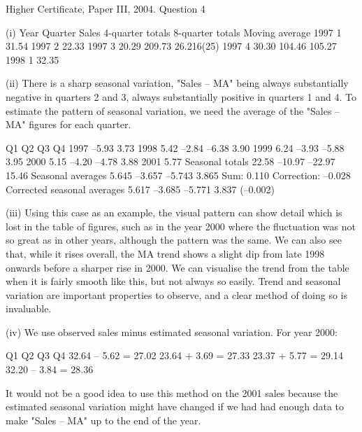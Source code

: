 \documentclass[a4paper,12pt]{article}
\begin{document}
Higher Certificate, Paper III, 2004.  Question 4 
 
 
(i) 
Year Quarter Sales 4-quarter totals 8-quarter totals 
Moving average 
1997 1 31.54    1997 2 22.33   1997 3 20.29 209.73 26.216(25) 1997 4 30.30 
 104.46 105.27   1998 1 32.35    
 
 
(ii) There is a sharp seasonal variation, "Sales – MA" being always substantially negative in quarters 2 and 3, always substantially positive in quarters 1 and 4.  To estimate the pattern of seasonal variation, we need the average of the "Sales – MA" figures for each quarter. 
 
 Q1 Q2 Q3 Q4   1997     –5.93   3.73   1998   5.42   –2.84   –6.38   3.90   1999   6.24   –3.93   –5.88   3.95   2000   5.15   –4.20   –4.78   3.88   2001   5.77      Seasonal totals 22.58 –10.97 –22.97 15.46   Seasonal averages     5.645     –3.657     –5.743     3.865 Sum:  0.110 Correction:  –0.028 Corrected seasonal averages     5.617     –3.685     –5.771     3.837 (–0.002)  
 
 
(iii) Using this case as an example, the visual pattern can show detail which is lost in the table of figures, such as in the year 2000 where the fluctuation was not so great as in other years, although the pattern was the same.  We can also see that, while it rises overall, the MA trend shows a slight dip from late 1998 onwards before a sharper rise in 2000.  We can visualise the trend from the table when it is fairly smooth like this, but not always so easily.  Trend and seasonal variation are important properties to observe, and a clear method of doing so is invaluable. 
 
 
(iv) We use observed sales minus estimated seasonal variation.  For year 2000: 
 
Q1 Q2 Q3 Q4 32.64 – 5.62 = 27.02 23.64 + 3.69 = 27.33 23.37 + 5.77 = 29.14 32.20 – 3.84 = 28.36 
 
It would not be a good idea to use this method on the 2001 sales because the estimated seasonal variation might have changed if we had had enough data to make "Sales – MA" up to the end of the year. 
 
\end{document}
